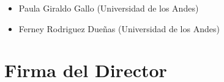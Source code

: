 \documentclass[12pt]{article}
\begin{document}

\begin{itemize}
	\item Paula Giraldo Gallo (Universidad de los Andes)
	\item Ferney Rodriguez Dueñas (Universidad de los Andes)
\end{itemize}





\section*{Firma del Director}
\vspace{1.5cm}
\end{document}
